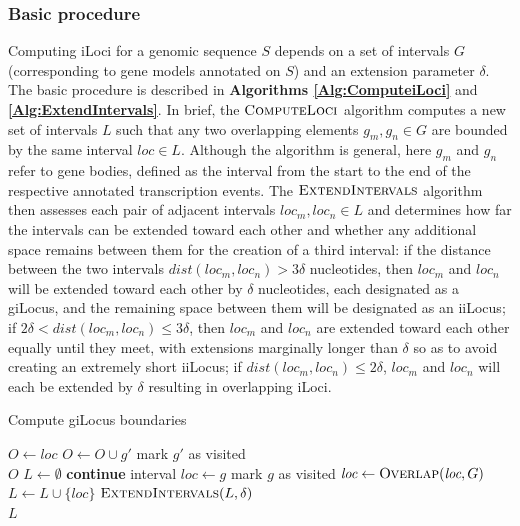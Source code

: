 \subsubsection*{Basic procedure}

Computing iLoci for a genomic sequence $S$ depends on a set of intervals $G$ (corresponding to gene models annotated on $S$) and an extension parameter $\delta$.
The basic procedure is described in \textbf{Algorithms \ref{Alg:ComputeiLoci}} and \textbf{\ref{Alg:ExtendIntervals}}.
In brief, the $\textsc{ComputeLoci}$ algorithm computes a new set of intervals $L$ such that any two overlapping elements $g_m, g_n \in G$ are bounded by the same interval $loc \in L$.
Although the algorithm is general, here $g_m$ and $g_n$ refer to gene bodies, defined as the interval from the start to the end of the respective annotated transcription events.
The $\textsc{ExtendIntervals}$ algorithm then assesses each pair of adjacent intervals $loc_m, loc_n \in L$ and determines how far the intervals can be extended toward each other and whether any additional space remains between them for the creation of a third interval:
if the distance between the two intervals $dist(loc_m, loc_n) > 3 \delta$ nucleotides, then $loc_m$ and $loc_n$ will be extended toward each other by $\delta$ nucleotides, each designated as a giLocus, and the remaining space between them will be designated as an iiLocus;
if $2\delta < dist(loc_m, loc_n) \leq 3\delta$, then $loc_m$ and $loc_n$ are extended toward each other equally until they meet, with extensions marginally longer than $\delta$ so as to avoid creating an extremely short iiLocus;
if $dist(loc_m, loc_n) \leq 2\delta$, $loc_m$ and $loc_n$ will each be extended by $\delta$ resulting in overlapping iLoci.

\begin{algorithm}
\caption{Compute giLocus boundaries}
\label{Alg:ComputeiLoci}
\begin{algorithmic}[1]
\State $O \gets loc$
        \State $O \gets O \cup g'$
        \State mark $g'$ as visited
    \EndIf
\EndFor \\
\Return $O$
\EndProcedure
{}
\State $L \gets \emptyset$
        \State \textbf{continue}
    \EndIf
    \State interval $\textit{loc} \gets g$
    \State mark $g$ as visited
        \State $\textit{loc} \gets \textsc{Overlap}(\textit{loc}, G)$
    \EndWhile
    \State $L \gets L \cup \{\textit{loc}\}$
\EndFor
\State $\textsc{ExtendIntervals}(L, \delta)$ \\
\Return $L$
\EndProcedure
\end{algorithmic}
\end{algorithm}

